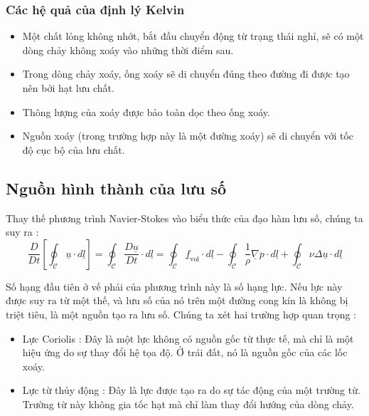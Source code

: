 \documentclass[THUY_DONG_HOC.tex]{subfiles}
\begin{document}
\subsubsection{Các hệ quả của định lý Kelvin}
\begin{itemize}
	\item Một chất lỏng không nhớt, bắt đầu chuyển động từ trạng thái nghỉ, sẽ có một dòng chảy không xoáy vào những thời điểm sau.
	\item Trong dòng chảy xoáy, ống xoáy sẽ di chuyển đúng theo đường đi được tạo nên bởi hạt lưu chất.
	\item Thông lượng của xoáy được bảo toàn dọc theo ống xoáy.
	\item Nguồn xoáy (trong trường hợp này là một đường xoáy) sẽ di chuyển với tốc độ cục bộ của lưu chất.
\end{itemize}

\subsection{Nguồn hình thành của lưu số}

Thay thế phương trình Navier-Stokes vào biểu thức của đạo hàm lưu số, chúng ta suy ra :
$$
	\frac{D}{{Dt}}\left[ {\oint_\mathscr{C} {\underline u  \cdot d\underline l } } \right] = \oint_\mathscr{C} {\frac{{D\underline u }}{{Dt}} \cdot d\underline l }  = \oint_\mathscr{C} {\underline{f}_{\text{vol}}  \cdot d\underline l }  - \oint_\mathscr{C} {\frac{1}{\rho }{\underline{\nabla}p} \cdot d\underline l }  + \oint_\mathscr{C} {\nu \Delta \underline u  \cdot d\underline l }
$$

Số hạng đầu tiên ở vế phải của phương trình này là số hạng lực. Nếu lực này  được suy ra từ một thế, và lưu số của nó trên một đường cong kín là không bị triệt tiêu, là một nguồn tạo ra lưu số. Chúng ta xét hai trường hợp quan trọng :
\begin{itemize}
	\item Lực Coriolis : Đây là một lực không có nguồn gốc từ thực tế, mà chỉ là một hiệu ứng do sự thay đổi hệ tọa độ. Ở trái đất, nó là nguồn gốc của các lốc xoáy.
	\item Lực từ thủy động : Đây là lực được tạo ra do sự tác động của một trường từ. Trường từ này không gia tốc hạt mà chỉ làm thay đổi hướng của dòng chảy.
\end{itemize}
\end{document}
